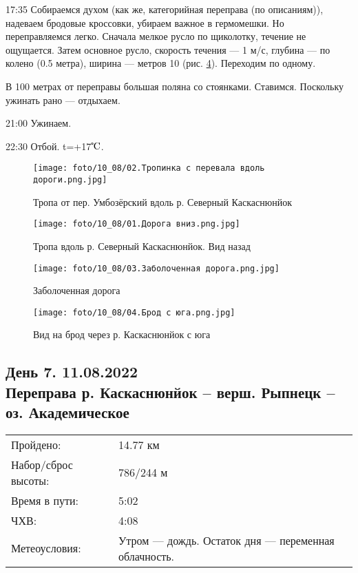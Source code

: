 17:35 Собираемся духом (как же, категорийная переправа (по описаниям)), надеваем бродовые кроссовки,
убираем важное в гермомешки. Но переправляемся легко. Сначала мелкое русло по щиколотку, течение не ощущается.
Затем основное русло, скорость течения --- 1 м/с, глубина --- по колено (0.5 метра), ширина --- метров 10 (рис. \ref{fig6:4}).
Переходим по одному.

В 100 метрах от переправы большая поляна со стоянками. Ставимся. Поскольку ужинать рано --- отдыхаем.

21:00 Ужинаем.

22:30 Отбой. t=+17$\tccentigrade$.

\begin{figure}
    \centering
    \texttt{[image: foto/10\_08/02.Тропинка с перевала вдоль дороги.png.jpg]}
    \caption{Тропа от пер. Умбозёрский вдоль р. Северный Каскаснюнйок}
    \label{fig6:1}
\end{figure}

\begin{figure}
    \centering
    \texttt{[image: foto/10\_08/01.Дорога вниз.png.jpg]}
    \caption{Тропа вдоль р. Северный Каскаснюнйок. Вид назад}
    \label{fig6:2}
\end{figure}

\begin{figure}
    \centering
    \texttt{[image: foto/10\_08/03.Заболоченная дорога.png.jpg]}
    \caption{Заболоченная дорога}
    \label{fig6:3}
\end{figure}

\begin{figure}
    \centering
    \texttt{[image: foto/10\_08/04.Брод с юга.png.jpg]}
    \caption{Вид на брод через р. Каскаснюнйок с юга}
    \label{fig6:4}
\end{figure}

\FloatBarrier

\subsection{День 7. 11.08.2022\\
Переправа р. Каскаснюнйок -- верш. Рыпнецк -- оз. Академическое}
\begin{tabular}{l p{12cm}}
\hline
Пройдено: & 14.77 км\\
Набор/сброс высоты: & 786/244 м\\
Время в пути: & 5:02\\
ЧХВ: & 4:08\\
Метеоусловия: & Утром --- дождь. Остаток дня --- переменная облачность.\\
\hline
\end{tabular}

